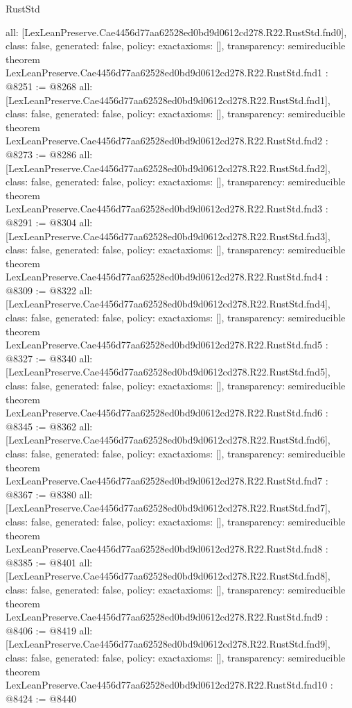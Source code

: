 \begin{lexlean}{RustStd}
\begin{coremodule}
{  all: [LexLeanPreserve.Cae4456d77aa62528ed0bd9d0612cd278.R22.RustStd.fnd0],
  class: false,
  generated: false,
  policy: exact{axioms: []},
  transparency: semireducible
}
theorem LexLeanPreserve.Cae4456d77aa62528ed0bd9d0612cd278.R22.RustStd.fnd1 : @8251 := @8268 {
  all: [LexLeanPreserve.Cae4456d77aa62528ed0bd9d0612cd278.R22.RustStd.fnd1],
  class: false,
  generated: false,
  policy: exact{axioms: []},
  transparency: semireducible
}
theorem LexLeanPreserve.Cae4456d77aa62528ed0bd9d0612cd278.R22.RustStd.fnd2 : @8273 := @8286 {
  all: [LexLeanPreserve.Cae4456d77aa62528ed0bd9d0612cd278.R22.RustStd.fnd2],
  class: false,
  generated: false,
  policy: exact{axioms: []},
  transparency: semireducible
}
theorem LexLeanPreserve.Cae4456d77aa62528ed0bd9d0612cd278.R22.RustStd.fnd3 : @8291 := @8304 {
  all: [LexLeanPreserve.Cae4456d77aa62528ed0bd9d0612cd278.R22.RustStd.fnd3],
  class: false,
  generated: false,
  policy: exact{axioms: []},
  transparency: semireducible
}
theorem LexLeanPreserve.Cae4456d77aa62528ed0bd9d0612cd278.R22.RustStd.fnd4 : @8309 := @8322 {
  all: [LexLeanPreserve.Cae4456d77aa62528ed0bd9d0612cd278.R22.RustStd.fnd4],
  class: false,
  generated: false,
  policy: exact{axioms: []},
  transparency: semireducible
}
theorem LexLeanPreserve.Cae4456d77aa62528ed0bd9d0612cd278.R22.RustStd.fnd5 : @8327 := @8340 {
  all: [LexLeanPreserve.Cae4456d77aa62528ed0bd9d0612cd278.R22.RustStd.fnd5],
  class: false,
  generated: false,
  policy: exact{axioms: []},
  transparency: semireducible
}
theorem LexLeanPreserve.Cae4456d77aa62528ed0bd9d0612cd278.R22.RustStd.fnd6 : @8345 := @8362 {
  all: [LexLeanPreserve.Cae4456d77aa62528ed0bd9d0612cd278.R22.RustStd.fnd6],
  class: false,
  generated: false,
  policy: exact{axioms: []},
  transparency: semireducible
}
theorem LexLeanPreserve.Cae4456d77aa62528ed0bd9d0612cd278.R22.RustStd.fnd7 : @8367 := @8380 {
  all: [LexLeanPreserve.Cae4456d77aa62528ed0bd9d0612cd278.R22.RustStd.fnd7],
  class: false,
  generated: false,
  policy: exact{axioms: []},
  transparency: semireducible
}
theorem LexLeanPreserve.Cae4456d77aa62528ed0bd9d0612cd278.R22.RustStd.fnd8 : @8385 := @8401 {
  all: [LexLeanPreserve.Cae4456d77aa62528ed0bd9d0612cd278.R22.RustStd.fnd8],
  class: false,
  generated: false,
  policy: exact{axioms: []},
  transparency: semireducible
}
theorem LexLeanPreserve.Cae4456d77aa62528ed0bd9d0612cd278.R22.RustStd.fnd9 : @8406 := @8419 {
  all: [LexLeanPreserve.Cae4456d77aa62528ed0bd9d0612cd278.R22.RustStd.fnd9],
  class: false,
  generated: false,
  policy: exact{axioms: []},
  transparency: semireducible
}
theorem LexLeanPreserve.Cae4456d77aa62528ed0bd9d0612cd278.R22.RustStd.fnd10 : @8424 := @8440 {
}
\end{coremodule}
\end{lexlean}
